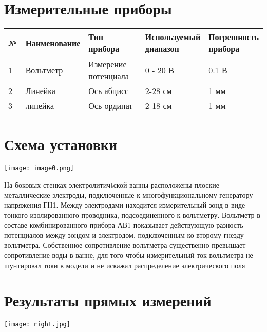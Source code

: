 \documentclass[12pt]{extarticle}
\begin{document}
    \section{Измерительные приборы}
    \begin{tabular}{|p{1cm}|p{4cm}|p{5cm}|p{32mm}|p{3cm}|}
        \hline
        \textbf{№} & \textbf{Наименование} & \textbf{Тип прибора} & \makecell{\textbf{Используемый}\\\textbf{диапазон}} & \makecell{\textbf{Погрешность}\\\textbf{прибора}} \\ \hline
        1 & Вольтметр & Измерение потенциала & 0 - 20 В & 0.1 В \\ \hline
        2 & Линейка & Ось абцисс & 2-28 см & 1 мм \\ \hline
        3 & линейка & Ось ординат & 2-18 см & 1 мм \\
        \hline
    \end{tabular}
    
    \section{Схема установки}
    \begin{minipage}{0.5\textwidth}
        \texttt{[image: image0.png]}
    \end{minipage}
    \hfill
    \begin{minipage}{0.4\textwidth}
        На боковых стенках электролитичtской ванны
        расположены плоские металлические электроды,
        подключенные к многофункциональному генератору напряжения ГН1.
        Между электродами находится измерительный зонд в виде 
        тонкого изолированного проводника, подсоединенного к вольтметру.
        Вольтметр в составе комбинированного прибора АВ1 показывает
        действующую разность потенциалов между зондом и электродом,
        подключенным ко второму гнезду вольтметра. Собственное 
        сопротивление вольтметра существенно превышает сопротивление
        воды в ванне, для того чтобы измерительный ток вольтметра не
        шунтировал токи в модели и не искажал распределение электрического поля
    \end{minipage}

    \newpage
    \section{Результаты прямых измерений}
    \texttt{[image: right.jpg]}
\end{document}

